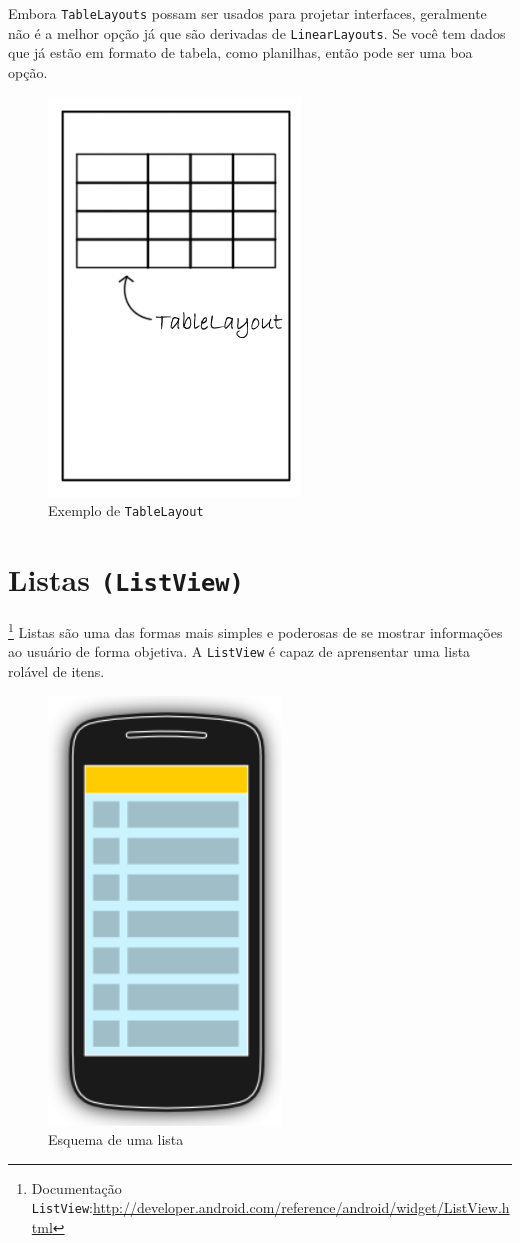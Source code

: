\documentclass[a4paper,12pt,brazil]{book}
\begin{document}
\begin{singlespace}
Embora \texttt{TableLayouts} possam ser usados para projetar interfaces, geralmente não é a melhor opção já que são derivadas de \texttt{LinearLayouts}. Se você tem dados que já estão em formato de tabela, como planilhas, então pode ser uma boa opção.

\begin{figure}[H]
  \centering
  \includegraphics[width=.25\textwidth]{figuras/design/tablelayout.jpg}
  \caption{Exemplo de \texttt{TableLayout}}
  \label{fig:e}
\end{figure}

\section{Listas \texttt{(ListView)}}\footnote{Documentação \texttt{ListView}:\href{http://developer.android.com/reference/android/widget/ListView.html}{http://developer.android.com/reference/android/widget/ListView.html}}
Listas são uma das formas mais simples e poderosas de se mostrar informações ao usuário de forma objetiva. A \texttt{ListView} é capaz de aprensentar uma lista rolável de itens. 

\begin{figure}[H]
  \centering
  \includegraphics[width=.25\textwidth]{figuras/design/listview-scheme.png}
  \caption{Esquema de uma lista}
  \label{fig:e}
\end{figure}


\end{singlespace}
\end{document}

